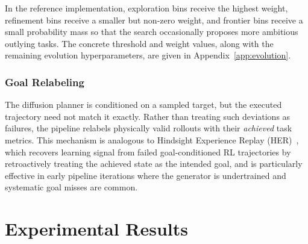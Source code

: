 \documentclass{article}
\begin{document}
In the reference implementation, exploration bins receive the highest
weight, refinement bins receive a smaller but non-zero weight, and
frontier bins receive a small probability mass so that the search
occasionally proposes more ambitious outlying tasks. The concrete threshold and weight values, along with the remaining evolution hyperparameters, are given in Appendix~\ref{app:evolution}.

\subsubsection{Goal Relabeling}
\label{sec:relabel}

The diffusion planner is conditioned on a sampled target, but the executed trajectory need not match it exactly. Rather than treating such deviations as failures, the pipeline relabels physically valid rollouts with their \emph{achieved} task metrics. This mechanism is analogous to Hindsight Experience Replay (HER)~\cite{andrychowicz2017her}, which recovers learning signal from failed goal-conditioned RL trajectories by retroactively treating the achieved state as the intended goal, and is particularly effective in early pipeline iterations where the generator is undertrained and systematic goal misses are common.





\section{Experimental Results}
\label{sec:result}
\end{document}
